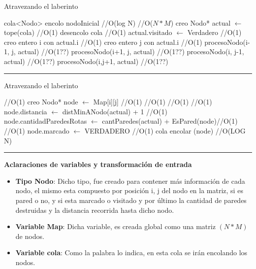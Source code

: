 \begin{algorithm}[H]
\caption{Atravezando el laberinto}
\begin{algorithmic}[1]
\state cola<Nodo> encolo nodoInicial \hfill //O(log N)
 \hfill //O($N \ast M$)
\state creo Nodo* actual $\gets$ tope(cola) \hfill //O(1)
\state desencolo cola \hfill //O(1)
\state actual.visitado $\gets$ Verdadero \hfill //O(1)
\state creo entero i con actual.i \hfill //O(1)
\state creo entero j con actual.i \hfill //O(1)
\state procesoNodo(i-1, j, actual) \hfill //O(1??)
\state procesoNodo(i+1, j, actual) \hfill //O(1??)
\state procesoNodo(i, j-1, actual) \hfill //O(1??)
\state procesoNodo(i,j+1, actual) \hfill //O(1??)
\endwhile
\EndFunction 
\end{algorithmic}
\hrule
{}
\end{algorithm}


\begin{algorithm}[H]
\caption{Atravezando el laberinto}
\begin{algorithmic}[1]
 \hfill //O(1)
\state creo Nodo* node $\gets$ Map[i][j] \hfill //O(1)
 \hfill //O(1)
 \hfill //O(1)
 \hfill //O(1)
\state node.distancia $\gets$ distMinANodo(actual) + 1  \hfill //O(1)
\state node.cantidadParedesRotas $\gets$ cantParedes(actual) + EsPared(node)\hfill //O(1)
 \hfill //O(1)
\state node.marcado $\gets$ VERDADERO  \hfill //O(1)
\state cola encolar (node)  \hfill //O(LOG N)
\endif
\endif
\endif
\endif
\endif
\EndFunction 
\end{algorithmic}
\hrule
{}
\end{algorithm}

\textbf{Aclaraciones de variables y transformaci\'on de entrada}

\begin{itemize}
\item {\bf Tipo Nodo}: Dicho tipo, fue creado para contener m\'as informaci\'on de cada nodo, el mismo esta compuesto por posici\'on i, j del nodo en la matriz, si es pared o no, y si esta marcado o visitado y por \'ultimo la cantidad de paredes destruidas y la distancia recorrida hasta dicho nodo.
\item {\bf Variable Map}: Dicha variable, es creada global como una matriz $(N \ast M)$ de nodos.
\item {\bf Variable cola}: Como la palabra lo indica, en esta cola se ir\'an encolando los nodos.
\end{itemize}  


